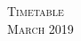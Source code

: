 \documentclass[10pt]{article} %
\begin{document}
\pagestyle{empty} %

\setlength{\parindent}{0pt} %



\begin{center}
	\textsc{\LARGE Timetable}\\ %
	\textsc{\large March 2019} %
\end{center}

\end{document}
